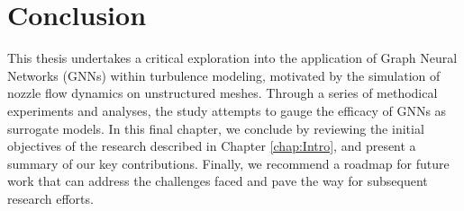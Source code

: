 \chapter{Conclusion}
\label{chap:Conclusion}
This thesis undertakes a critical exploration into the application of Graph Neural Networks (GNNs) within turbulence modeling, motivated by the simulation of nozzle flow dynamics on unstructured meshes. Through a series of methodical experiments and analyses, the study attempts to gauge the efficacy of GNNs as surrogate models. 
In this final chapter, we conclude by reviewing the initial objectives of the research described in Chapter \ref{chap:Intro}, and present a summary of our key contributions. Finally, we recommend a roadmap for future work that can address the challenges faced and pave the way for subsequent research efforts. 









